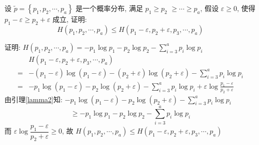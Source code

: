   \begin{exercise}
设 $ \widetilde{p}=\left\{p_{1}, p_{2}, \cdots, p_{a}\right\} $ 是一个概率分布, 满足 $ p_{1} \geqslant p_{2} $ $ \geqslant \cdots \geqslant p_{a} $, 假设 $ \varepsilon \geqslant 0 $, 使得 $ p_{1}-\varepsilon \geqslant p_{2}+\varepsilon $ 成立, 证明:
$$
H\left(p_{1}, p_{2}, \cdots, p_{a}\right) \leqslant H\left(p_{1}-\varepsilon, p_{2}+\varepsilon, p_{3}, \cdots, p_{a}\right)
$$
 \end{exercise}
 \begin{solution}
     证明: $ H\left(p_{1}, p_{2}, \cdots, p_{a}\right)=-p_{1} \log p_{1}-p_{2} \log p_{2}-\sum\limits_{i=3}^{a} p_{i} \log p_{i} $
$$
\begin{aligned}
& H\left(p_{1}-\varepsilon, p_{2}+\varepsilon, p_{3}, \cdots, p_{a}\right) \\
= & -\left(p_{1}-\varepsilon\right) \log \left(p_{1}-\varepsilon\right)-\left(p_{2}+\varepsilon\right) \log \left(p_{2}+\varepsilon\right)-\sum_{i=3}^{a} p_{i} \log p_{i} \\
= & -p_{1} \log \left(p_{1}-\varepsilon\right)-p_{2} \log \left(p_{2}+\varepsilon\right)-\sum_{i=3}^{a} p_{i} \log p_{i}+\varepsilon \log \frac{p_{1}-\varepsilon}{p_{2}+\varepsilon}
\end{aligned}
$$
由引理\ref{lamma2}知: $ -p_{1} \log \left(p_{1}-\varepsilon\right)-p_{2} \log \left(p_{2}+\varepsilon\right)-\sum\limits_{i=3}^{a} p_{i} \log p_{i} $
$$
\geqslant-p_{1} \log p_{1}-p_{2} \log p_{2}-\sum_{i=3}^{a} p_{i} \log p_{i}
$$
而 $ \varepsilon \log \dfrac{p_{1}-\varepsilon}{p_{2}+\varepsilon} \geqslant 0 $,
故 $ H\left(p_{1}, p_{2}, \cdots, p_{a}\right) \leqslant H\left(p_{1}-\varepsilon, p_{2}+\varepsilon, p_{3}, \cdots, p_{a}\right) $
 \end{solution}


